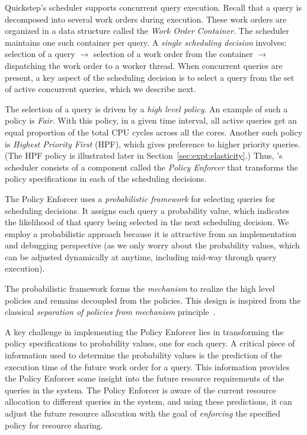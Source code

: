 Quickstep's scheduler supports concurrent query execution. Recall that a query is decomposed into several work orders during execution. These work orders are organized in a data structure called the \textit{Work Order Container}. The scheduler maintains one such container per query. A \textit{single scheduling decision} involves: selection of a query $\rightarrow$ selection of a work order from the container $\rightarrow$ dispatching the work order to a worker thread. When concurrent queries are present, a key aspect of the scheduling decision is to select a query from the set of active concurrent queries, which we describe next.

The selection of a query is driven by a \textit{high level policy}. An example of such a policy is \textit{Fair}. With this policy, in a given time interval, all active queries get an equal proportion of the total CPU cycles across all the cores. Another such policy is \textit{Highest Priority First} (HPF), which gives preference to higher priority queries. (The HPF policy is illustrated later in Section~\ref{sec:expt:elasticity}.) Thus, \Quickstep's scheduler consists of a component called the \textit{Policy Enforcer} that transforms the policy specifications in each of the scheduling decisions.

The Policy Enforcer uses a \textit{probabilistic framework} for selecting queries for scheduling decisions. It assigns each query a probability value, which indicates the likelihood of that query being selected in the next scheduling decision. %
We employ a probabilistic approach because it is attractive from an implementation and debugging perspective (as we only worry about the probability values, which can be adjusted dynamically at anytime, including mid-way through query execution).

The probabilistic framework forms the \textit{mechanism} to realize the high level policies and remains decoupled from the policies.
This design is inspired from the classical \textit{separation of policies from mechanism} principle~\cite{LampsonS76}.

A key challenge in implementing the Policy Enforcer lies in transforming the policy specifications to probability values, one for each query.
A critical piece of information used to determine the probability values is the prediction of the execution time of the future work order for a query.
This information provides the Policy Enforcer some insight into the future resource requirements of the queries in the system.
The Policy Enforcer is aware of the current resource allocation to different queries in the system, and using these predictions, it can adjust the future resource allocation with the goal of \textit{enforcing} the specified policy for resource sharing.

